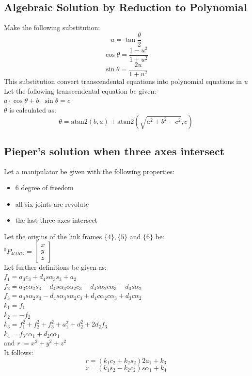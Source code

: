 \documentclass[10pt,a4paper]{article}
\newcommand{\vect}[1]{\ensuremath{\begin{bmatrix}#1\end{bmatrix}}}
\newcommand{\atan}{\ensuremath{\mathrm{atan2 }}}
\begin{document}
\subsection{Algebraic Solution by Reduction to Polynomial}
\label{inverse-substitution}
Make the following substitution:
$$
	u = \tan \frac \theta 2
$$
$$
	\cos \theta = \frac{1 - u^2}{1 + u^2}
$$
$$
	\sin \theta = \frac{2u}{1 + u^2}
$$
This substitution convert transcendental equations into polynomial equations in $u$ \\

Let the following transcendental  equation be given: \\
$a ⋅ \cos \theta + b ⋅ \sin \theta = c$ \\
$\theta$ is calculated as:
$$
	\theta = \atan(b,a) \pm \atan(\sqrt{a^2 + b^2 - c^2},c)
$$

\subsection{Pieper's solution when three axes intersect}
Let a manipulator be given with the following properties: \\
\begin{itemize}
	\item 6 degree of freedom
	\item all six joints are revolute
	\item the last three axes intersect
\end{itemize}
Let the origins of the link frames $\{4\}, \{5\}$ and $\{6\}$ be: \\
$^0P_{4ORG} = \vect{x \\ y \\ z}$ \\
Let further definitions be given as: \\
$f_1 = a_3c_3 + d_4s\alpha_3s_3 + a_2$ \\
$f_2 = a_3c\alpha_2s_3 - d_4s\alpha_3c\alpha_2c_3 - d_4s\alpha_2c\alpha_3 - d_3s\alpha_2$ \\
$f_3 = a_3s\alpha_2s_3 - d_4s\alpha_3s\alpha_2c_3 + d_4c\alpha_2c\alpha_3 + d_3c\alpha_2$ \\
$k_1 = f_1$ \\
$k_2 = -f_2$ \\
$k_3 = f_1^2 + f_2^2 + f_3^2 + a_1^2 + d_2^2 + 2d_2f_3$ \\
$k_4 = f_3c\alpha_1 + d_2c\alpha_1$ \\
and $r:= x^2 + y^2 + z^2$ \\
It follows: \\
$$
	r = (k_1c_2 + k_2s_2)2a_1 + k_3
$$
$$
	z = (k_1s_2 - k_2c_2)s\alpha_1 + k_4
$$
\end{document}
